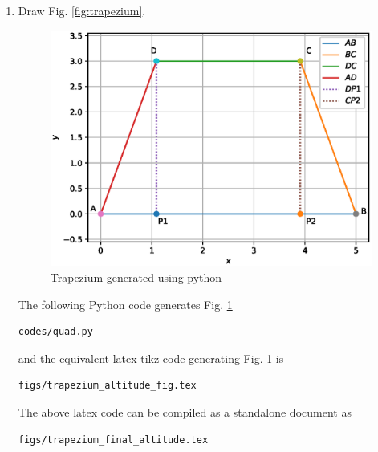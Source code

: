 \begin{enumerate}[label=\thesection.\arabic*.,ref=\thesection.\theenumi]
\newpage

\item Draw Fig. \ref{fig:trapezium}.

\begin{figure}[!ht]
\centering
\includegraphics[width=\columnwidth]{./figs/trapezium_altitude.eps}
\caption{Trapezium generated using python}
\label{fig:trapezium2}
\end{figure} 

\solution The  following Python code generates Fig. \ref{fig:trapezium2}

\begin{lstlisting}
codes/quad.py
\end{lstlisting}

and the equivalent latex-tikz code generating Fig. \ref{fig:trapezium2} is 
\begin{lstlisting}
figs/trapezium_altitude_fig.tex
\end{lstlisting}
%
The above latex code can be compiled as a standalone document as
\begin{lstlisting}
figs/trapezium_final_altitude.tex
\end{lstlisting}
\end{enumerate}

